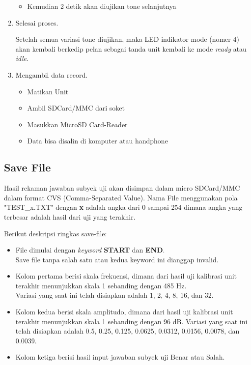 \documentclass[12pt,]{article}
\begin{document}
\begin{enumerate}
\begin{itemize}
			\item Kemudian 2 detik akan diujikan tone selanjutnya	
		\end{itemize}
		
		\item Selesai proses.
		
		Setelah semua variasi tone diujikan, maka LED indikator mode (nomer 4) akan kembali berkedip pelan sebagai tanda unit kembali ke mode \textit{ready} atau \textit{idle}.
		
		\item Mengambil data record.
		\begin{itemize}
			\item Matikan Unit
			\item Ambil SDCard/MMC dari soket
			\item Masukkan MicroSD Card-Reader
			\item Data bisa disalin di komputer atau handphone
		\end{itemize}
	\end{enumerate}
		
	\newpage
	\subsection{Save File}
	
	Hasil rekaman jawaban subyek uji akan disimpan dalam micro SDCard/MMC dalam format CVS (Comma-Separated Value).
	Nama File menggunakan pola "TEST\_x.TXT" dengan \textbf{x} adalah angka dari 0 sampai 254 dimana angka yang terbesar adalah hasil dari uji yang terakhir.

	Berikut deskripsi ringkas save-file:
	\begin{itemize}
		\item File dimulai dengan \textit{keyword} \textbf{START} dan \textbf{END}.\\
		Save file tanpa salah satu atau kedua keyword ini dianggap invalid.
		
		\item Kolom pertama berisi skala frekuensi, dimana dari hasil uji kalibrasi unit terakhir menunjukkan skala 1 sebanding dengan 485 Hz.\\
		Variasi yang saat ini telah disiapkan adalah 1, 2, 4, 8, 16, dan 32.
		
		\item Kolom kedua berisi skala amplitudo, dimana dari hasil uji kalibrasi unit terakhir menunjukkan skala 1 sebanding dengan 96 dB.
		Variasi yang saat ini telah disiapkan adalah 0.5, 0.25, 0.125, 0.0625, 0.0312, 0.0156, 0.0078, dan 0.0039.
		
		\item Kolom ketiga berisi hasil input jawaban subyek uji Benar atau Salah.
	\end{itemize}
	
\end{document}
